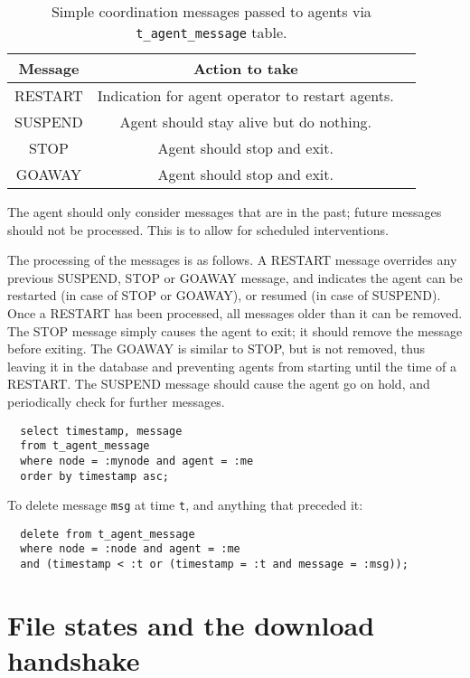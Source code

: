 \documentclass{cmspaper}
\begin{document}
\begin{table}
\centering
\begin{tabular}[!h]{|c|c|l|} 
\hline Message  & Action to take
\\ \hline
	RESTART & Indication for agent operator to restart agents.
\\	SUSPEND & Agent should stay alive but do nothing.
\\	STOP    & Agent should stop and exit.
\\	GOAWAY  & Agent should stop and exit.
\\ \hline
\end{tabular}
\caption{Simple coordination messages passed to agents via \texttt{t\_agent\_message} table.}
\label{table:messages}
\end{table}

The agent should only consider messages that are in the past; future messages should not be processed.  This is to allow for scheduled interventions.

The processing of the messages is as follows.  A RESTART message overrides any previous SUSPEND, STOP or GOAWAY message, and indicates the agent can be restarted (in case of STOP or GOAWAY), or resumed (in case of SUSPEND).  Once a RESTART has been processed, all messages older than it can be removed.  The STOP message simply causes the agent to exit; it should remove the message before exiting.  The GOAWAY is similar to STOP, but is not removed, thus leaving it in the database and preventing agents from starting until the time of a RESTART.  The SUSPEND message should cause the agent go on hold, and periodically check for further messages.

{\small\begin{verbatim}
  select timestamp, message
  from t_agent_message
  where node = :mynode and agent = :me
  order by timestamp asc;
\end{verbatim}}

To delete message \texttt{msg} at time \texttt{t}, and anything that preceded it:

{\small\begin{verbatim}
  delete from t_agent_message
  where node = :node and agent = :me
  and (timestamp < :t or (timestamp = :t and message = :msg));
\end{verbatim}}


\section{File states and the download handshake}
\end{document}

